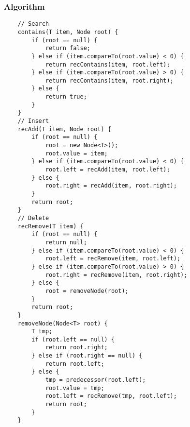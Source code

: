 \documentclass[10pt, 
a4paper, 
oneside, 
headinclude, footinclude, 
BCOR5mm]
{scrartcl}
\begin{document}
\subsubsection{Algorithm}
\begin{lstlisting}
    // Search
    contains(T item, Node root) {
        if (root == null) {
            return false;
        } else if (item.compareTo(root.value) < 0) {
            return recContains(item, root.left);
        } else if (item.compareTo(root.value) > 0) {
            return recContains(item, root.right);
        } else {
            return true;
        }
    }
    // Insert
    recAdd(T item, Node root) {
        if (root == null) {
            root = new Node<T>();
            root.value = item;
        } else if (item.compareTo(root.value) < 0) {
            root.left = recAdd(item, root.left);
        } else {
            root.right = recAdd(item, root.right);
        }
        return root;
    }
    // Delete
    recRemove(T item) {
        if (root == null) {
            return null;
        } else if (item.compareTo(root.value) < 0) {
            root.left = recRemove(item, root.left);
        } else if (item.compareTo(root.value) > 0) {
            root.right = recRemove(item, root.right);
        } else {
            root = removeNode(root);
        }
        return root;
    }
    removeNode(Node<T> root) {
        T tmp;
        if (root.left == null) {
            return root.right;
        } else if (root.right == null) {
            return root.left;
        } else {
            tmp = predecessor(root.left);
            root.value = tmp;
            root.left = recRemove(tmp, root.left);
            return root;
        }
    }
\end{lstlisting}
\end{document}
